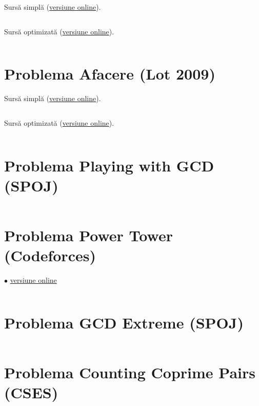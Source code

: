 \documentclass[../main.tex]{subfiles}
\begin{document}
Sursă simplă (\href{https://kilonova.ro/submissions/850074}{versiune online}).

\inputminted{cpp}{../src/math/secvxor-1.cpp}

Sursă optimizată (\href{https://kilonova.ro/submissions/850075}{versiune online}).

\inputminted{cpp}{../src/math/secvxor-2.cpp}

\section{Problema Afacere (Lot 2009)}
\label{code:afacere}

Sursă simplă (\href{https://kilonova.ro/submissions/848974}{versiune online}).

\inputminted{cpp}{../src/math/afacere-1.cpp}

Sursă optimizată (\href{https://kilonova.ro/submissions/849042}{versiune online}).

\inputminted{cpp}{../src/math/afacere-2.cpp}

\section{Problema Playing with GCD (SPOJ)}
\label{code:playing-with-gcd}

\inputminted{cpp}{../src/math/playing-with-gcd.cpp}

\section{Problema Power Tower (Codeforces)}
\label{code:power-tower}
$\bullet$
\href{https://codeforces.com/contest/906/submission/287062467}{versiune online}

\inputminted{cpp}{../src/math/power-tower.cpp}

\section{Problema GCD Extreme (SPOJ)}
\label{code:gcd-extreme}

\inputminted{cpp}{../src/math/gcd-extreme.cpp}

\section{Problema Counting Coprime Pairs (CSES)}
\label{code:counting-coprime-pairs}
\end{document}
